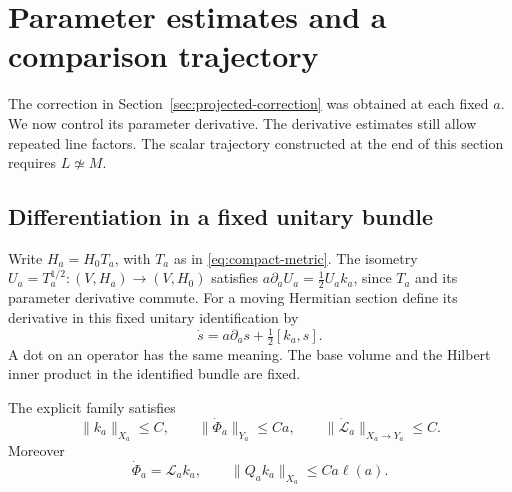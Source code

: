 \section{Parameter estimates and a comparison trajectory}
\label{sec:parameter-trajectory}

The correction in Section~\ref{sec:projected-correction} was obtained
at each fixed \(a\). We now control its parameter derivative. The
derivative estimates still allow repeated line factors. The scalar
trajectory constructed at the end of this section requires
\(L\not\simeq M\).

\subsection{Differentiation in a fixed unitary bundle}

Write \(H_a=H_0T_a\), with \(T_a\) as in
\eqref{eq:compact-metric}. The isometry
\(U_a=T_a^{1/2}:(V,H_a)\to(V,H_0)\) satisfies
\(a\partial_aU_a=\frac12U_ak_a\), since \(T_a\) and its
parameter derivative commute. For a moving Hermitian section
define its derivative in this fixed unitary identification by
\begin{equation}\label{eq:unitary-parameter-derivative}
 \dot s=a\partial_as+\tfrac12[k_a,s].
\end{equation}
A dot on an operator has the same meaning. The base volume and
the Hilbert inner product in the identified bundle are fixed.

\begin{lemma}\label{lem:background-parameter}
The explicit family satisfies
\begin{equation}\label{eq:background-parameter-bounds}
 \|k_a\|_{X_a}\le C,\qquad
 \|\dot\Phi_a\|_{Y_a}\le Ca,\qquad
 \|\dot{\mathcal L}_a\|_{X_a\to Y_a}\le C.
\end{equation}
Moreover
\begin{equation}\label{eq:parameter-linearization}
 \dot\Phi_a=\mathcal L_ak_a,\qquad
 \|Q_ak_a\|_{X_a}\le Ca\ell(a).
\end{equation}
\end{lemma}

